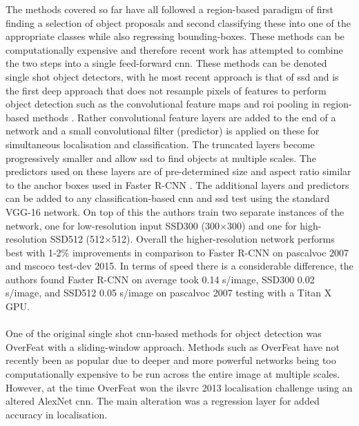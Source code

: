 The methods covered so far have all followed a region-based paradigm of first finding a selection of object proposals and second classifying these into one of the appropriate classes while also regressing bounding-boxes. These methods can be computationally expensive and therefore recent work has attempted to combine the two steps into a single feed-forward \gls{cnn}. These methods can be denoted single shot object detectors, with he most recent approach is that of \gls{ssd} \cite{ssd} and is the first deep approach that does not resample pixels of features to perform object detection such as the convolutional feature maps and \gls {roi} pooling in region-based methods \cite{fastrcnn} \cite{fasterrcnn}. Rather convolutional feature layers are added to the end of a network and a small convolutional filter (predictor) is applied on these for simultaneous localisation and classification. The truncated layers become progressively smaller and allow \gls{ssd} to find objects at multiple scales. The predictors used on these layers are of pre-determined size and aspect ratio similar to the anchor boxes used in Faster R-CNN \cite{fasterrcnn}. The additional layers and predictors can be added to any classification-based \gls{cnn} and \gls{ssd} test using the standard VGG-16 network. On top of this the authors train two separate instances of the network, one for low-resolution input SSD300 (300$\times$300) and one for high-resolution SSD512 (512$\times$512). Overall the higher-resolution network performs best with 1-2\% improvements in comparison to Faster R-CNN on \gls{pascalvoc} 2007 and \gls{mscoco} test-dev 2015. In terms of speed there is a considerable difference, the authors found Faster R-CNN on average took 0.14 s/image, SSD300 0.02 s/image, and SSD512 0.05 s/image on \gls{pascalvoc} 2007 testing with a Titan X GPU. 
\\\\
One of the original single shot \gls{cnn}-based methods for object detection was OverFeat \cite{overfeat} with a sliding-window approach. Methods such as OverFeat have not recently been as popular due to deeper and more powerful networks being too computationally expensive to be run across the entire image at multiple scales. However, at the time OverFeat won the \gls{ilsvrc} 2013 localisation challenge using an altered AlexNet \cite{alexnet} \gls{cnn}. The main alteration was a regression layer for added accuracy in localisation.
\\\\
